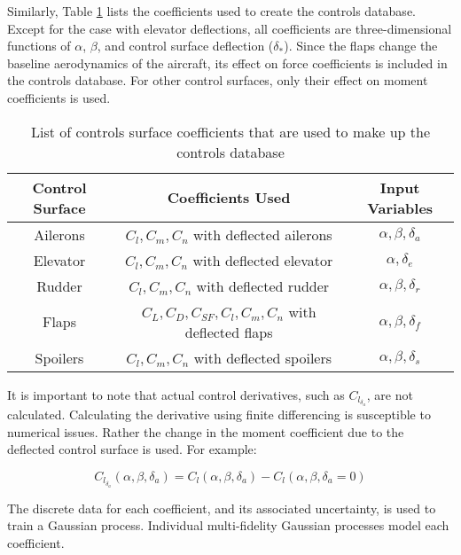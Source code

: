 Similarly, Table \ref{tab:control_db} lists the coefficients used to create the controls database.
Except for the case with elevator deflections, all coefficients are three-dimensional functions of $\alpha$, $\beta$, and control surface deflection ($\delta_*$).
Since the flaps change the baseline aerodynamics of the aircraft, its effect on force coefficients is included in the controls database.
For other control surfaces, only their effect on moment coefficients is used. 

\begin{table}
    \renewcommand{\arraystretch}{1.2}
    \centering
    \begin{tabular}{ c|c|c } 
         Control Surface & Coefficients Used & Input Variables \\ 
         \hline
         Ailerons & $C_l, C_m, C_n$ with deflected ailerons & $\alpha, \beta, \delta_a$  \\
         Elevator & $C_l, C_m, C_n$ with deflected elevator & $\alpha, \delta_e$  \\
         Rudder & $C_l, C_m, C_n$ with deflected rudder & $\alpha, \beta, \delta_r$  \\
         Flaps & $C_L, C_D, C_{SF}, C_l, C_m, C_n$ with deflected flaps & $\alpha, \beta, \delta_f$  \\
         Spoilers & $C_l, C_m, C_n$ with deflected spoilers & $\alpha, \beta, \delta_s$  \\
    \end{tabular}
    \caption{List of controls surface coefficients that are used to make up the controls database}
    \label{tab:control_db}
\end{table}

It is important to note that actual control derivatives, such as $C_{l_{\delta_a}}$, are not calculated.
Calculating the derivative using finite differencing is susceptible to numerical issues.
Rather the change in the moment coefficient due to the deflected control surface is used. For example: 

\begin{equation}\label{equ:control_derivative}
    C_{l_{\delta_a}}(\alpha,\beta,\delta_a) = C_l(\alpha,\beta,\delta_a) - C_l(\alpha,\beta,\delta_a=0)
\end{equation}

The discrete data for each coefficient, and its associated uncertainty, is used to train a Gaussian process.
Individual multi-fidelity Gaussian processes model each coefficient.